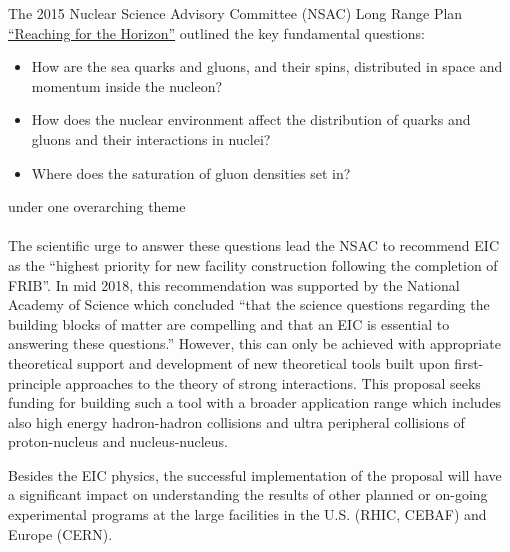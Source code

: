 
The 2015 Nuclear Science Advisory Committee (NSAC) Long Range Plan
\href{https://science.energy.gov/np/nsac/}
{``Reaching  for the Horizon''} outlined the key fundamental  questions: {\it 
\begin{itemize}
	\item [] How are the sea quarks and gluons, and their spins, distributed in
		space and momentum inside the nucleon? 
	\item [ ] How does the nuclear environment affect the distribution of
		quarks and gluons and their interactions in nuclei?
	\item [] Where does the saturation of gluon densities set in?
\end{itemize}}
\noindent 
under one overarching theme \\
 \\ \noindent 
The scientific  urge to answer these questions lead the NSAC 
to recommend EIC as the ``highest priority for new facility construction
following the completion of FRIB''. In mid 2018, this recommendation 
was supported by the National Academy of Science which  concluded 
``that the science questions
regarding the building blocks of matter are compelling and that an EIC is
essential to answering these questions.'' 
However, this can only be achieved   
with appropriate theoretical support %
and development of new theoretical tools built upon 
first-principle approaches  to 
the theory of strong interactions. 
This proposal seeks funding for building such a tool 
with a broader application range which includes also high energy hadron-hadron 
collisions and ultra peripheral collisions  of proton-nucleus and nucleus-nucleus.   

Besides the EIC physics, 
the successful implementation of the proposal will have a significant impact on 
understanding the results of other planned or on-going experimental programs  at the large 
facilities in the U.S. (RHIC, CEBAF) and Europe (CERN). 



